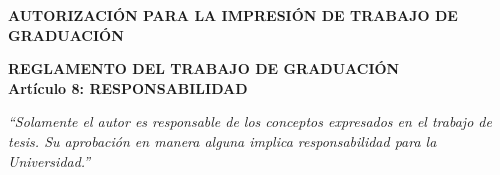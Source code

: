 \newpage
\thispagestyle{empty}
\begin{center}
    \vspace*{10cm}
    {\large\bfseries AUTORIZACIÓN PARA LA IMPRESIÓN DE TRABAJO DE GRADUACIÓN}\\[1.5cm]

    \newpage
    \vspace*{9cm}
    
    {\large\bfseries REGLAMENTO DEL TRABAJO DE GRADUACIÓN}\\[0.8cm]
    
    \textbf{Artículo 8: RESPONSABILIDAD}\\[0.5cm]
    
    \begin{minipage}{0.85\textwidth}
        \centering
        \itshape
        ``Solamente el autor es responsable de los conceptos expresados en el trabajo de tesis. Su aprobación en manera alguna implica responsabilidad para la Universidad.''
    \end{minipage}
\end{center}